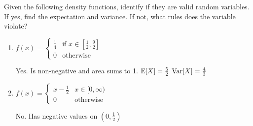 \question Given the following density functions, identify if they are 
valid random variables. If yes, find the expectation and variance. If 
not, what rules does the variable violate?
\begin{enumerate}[label=(\alph*)]
    \item
        $f(x) = \begin{cases} 
            \frac{1}{4} & \text{if } x \in [\frac{1}{2}, \frac{9}{2}] \\ 
            0 & \text{otherwise} 
        \end{cases}$
        \begin{solution}[2cm]
            Yes. Is non-negative and area sums to 1.
            $\text{E}[X] = \frac{5}{2}$
            $\text{Var}[X] = \frac{4}{3}$ 
        \end{solution}
    \item
        $f(x) = \begin{cases} 
            x - \frac{1}{2} & x \in [0, \infty) \\
            0 & \text{otherwise}
        \end{cases}$
        \begin{solution}[2cm]
            No. Has negative values on $(0, \frac{1}{2})$
        \end{solution}
\end{enumerate}
